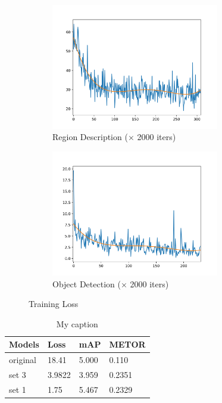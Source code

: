 \documentclass[12pt,a4paper]{report}
\begin{document}
\begin{figure}[h]
\begin{subfigure}{0.5\linewidth}
	\includegraphics[height=5.5cm,width=\textwidth]{origin_loss.png}
	\caption{Region Description ($\times$ 2000 iters)}
\end{subfigure}
\begin{subfigure}{0.5\linewidth}
	\includegraphics[height=5.5cm,width=\textwidth]{new_loss.png}
	\caption{Object Detection ($\times$ 2000 iters)}
\end{subfigure}
\label{dataset example}
\caption{Training Loss }
\end{figure}

\begin{table}[]
\centering
\caption{My caption}
\label{my-label}
\begin{tabular}{|l|l|l|l|}
\hline
Models   & Loss   & mAP   & METOR  \\ \hline
original & 18.41  & 5.000 & 0.110  \\ \hline
set 3    & 3.9822 & 3.959 & 0.2351 \\ \hline
set 1    & 1.75   & 5.467 & 0.2329 \\ \hline
\end{tabular}
\end{table}
\newpage
\end{document}
